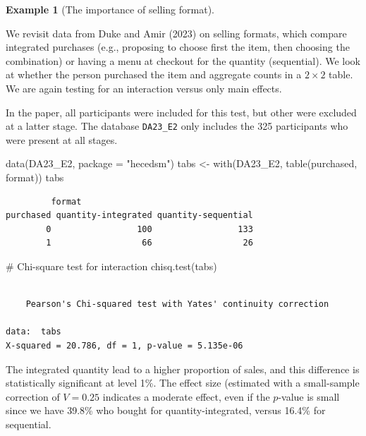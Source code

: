 \documentclass[
  11pt,
  letterpaper,
]{scrbook}
\newenvironment{Shaded}{\begin{snugshade}}{\end{snugshade}}
\newcommand{\AttributeTok}[1]{\textcolor[rgb]{0.40,0.45,0.13}{#1}}
\newcommand{\CommentTok}[1]{\textcolor[rgb]{0.37,0.37,0.37}{#1}}
\newcommand{\FunctionTok}[1]{\textcolor[rgb]{0.28,0.35,0.67}{#1}}
\newcommand{\NormalTok}[1]{\textcolor[rgb]{0.00,0.23,0.31}{#1}}
\newcommand{\OtherTok}[1]{\textcolor[rgb]{0.00,0.23,0.31}{#1}}
\newcommand{\StringTok}[1]{\textcolor[rgb]{0.13,0.47,0.30}{#1}}
\theoremstyle{definition}
\theoremstyle{definition}
\newtheorem{example}{Example}[chapter]
\theoremstyle{remark}
\begin{document}
\begin{example}[The importance of selling
format]\protect\hypertarget{exm-sellingformat}{}\label{exm-sellingformat}

We revisit data from Duke and Amir (2023) on selling formats, which
compare integrated purchases (e.g., proposing to choose first the item,
then choosing the combination) or having a menu at checkout for the
quantity (sequential). We look at whether the person purchased the item
and aggregate counts in a \(2 \times 2\) table. We are again testing for
an interaction versus only main effects.

In the paper, all participants were included for this test, but other
were excluded at a latter stage. The database \texttt{DA23\_E2} only
includes the 325 participants who were present at all stages.

\begin{Shaded}
\begin{Highlighting}[]
\FunctionTok{data}\NormalTok{(DA23\_E2, }\AttributeTok{package =} \StringTok{"hecedsm"}\NormalTok{)}
\NormalTok{tabs }\OtherTok{\textless{}{-}} \FunctionTok{with}\NormalTok{(DA23\_E2, }\FunctionTok{table}\NormalTok{(purchased, format))}
\NormalTok{tabs}
\end{Highlighting}
\end{Shaded}

\begin{verbatim}
         format
purchased quantity-integrated quantity-sequential
        0                 100                 133
        1                  66                  26
\end{verbatim}

\begin{Shaded}
\begin{Highlighting}[]
\CommentTok{\# Chi{-}square test for interaction}
\FunctionTok{chisq.test}\NormalTok{(tabs)}
\end{Highlighting}
\end{Shaded}

\begin{verbatim}

    Pearson's Chi-squared test with Yates' continuity correction

data:  tabs
X-squared = 20.786, df = 1, p-value = 5.135e-06
\end{verbatim}

The integrated quantity lead to a higher proportion of sales, and this
difference is statistically significant at level 1\%. The effect size
(estimated with a small-sample correction of \(V=0.25\) indicates a
moderate effect, even if the \(p\)-value is small since we have 39.8\%
who bought for quantity-integrated, versus 16.4\% for sequential.

\end{example}
\end{document}
